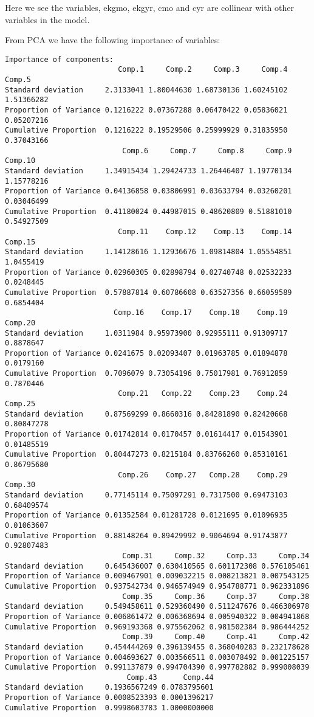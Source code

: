 \documentclass[a4paper]{article}
\begin{document}
Here we see the variables, ekgmo, ekgyr, cmo and cyr are collinear with other variables in the model. 

From PCA we have the following importance of variables:

\begin{lstlisting}[frame=single]
Importance of components:
                          Comp.1     Comp.2     Comp.3     Comp.4     Comp.5
Standard deviation     2.3133041 1.80044630 1.68730136 1.60245102 1.51366282
Proportion of Variance 0.1216222 0.07367288 0.06470422 0.05836021 0.05207216
Cumulative Proportion  0.1216222 0.19529506 0.25999929 0.31835950 0.37043166
                           Comp.6     Comp.7     Comp.8     Comp.9    Comp.10
Standard deviation     1.34915434 1.29424733 1.26446407 1.19770134 1.15778216
Proportion of Variance 0.04136858 0.03806991 0.03633794 0.03260201 0.03046499
Cumulative Proportion  0.41180024 0.44987015 0.48620809 0.51881010 0.54927509
                          Comp.11    Comp.12    Comp.13    Comp.14   Comp.15
Standard deviation     1.14128616 1.12936676 1.09814804 1.05554851 1.0455419
Proportion of Variance 0.02960305 0.02898794 0.02740748 0.02532233 0.0248445
Cumulative Proportion  0.57887814 0.60786608 0.63527356 0.66059589 0.6854404
                         Comp.16    Comp.17    Comp.18    Comp.19   Comp.20
Standard deviation     1.0311984 0.95973900 0.92955111 0.91309717 0.8878647
Proportion of Variance 0.0241675 0.02093407 0.01963785 0.01894878 0.0179160
Cumulative Proportion  0.7096079 0.73054196 0.75017981 0.76912859 0.7870446
                          Comp.21   Comp.22    Comp.23    Comp.24    Comp.25
Standard deviation     0.87569299 0.8660316 0.84281890 0.82420668 0.80847278
Proportion of Variance 0.01742814 0.0170457 0.01614417 0.01543901 0.01485519
Cumulative Proportion  0.80447273 0.8215184 0.83766260 0.85310161 0.86795680
                          Comp.26    Comp.27   Comp.28    Comp.29    Comp.30
Standard deviation     0.77145114 0.75097291 0.7317500 0.69473103 0.68409574
Proportion of Variance 0.01352584 0.01281728 0.0121695 0.01096935 0.01063607
Cumulative Proportion  0.88148264 0.89429992 0.9064694 0.91743877 0.92807483
                           Comp.31     Comp.32     Comp.33     Comp.34
Standard deviation     0.645436007 0.630410565 0.601172308 0.576105461
Proportion of Variance 0.009467901 0.009032215 0.008213821 0.007543125
Cumulative Proportion  0.937542734 0.946574949 0.954788771 0.962331896
                           Comp.35     Comp.36     Comp.37     Comp.38
Standard deviation     0.549458611 0.529360490 0.511247676 0.466306978
Proportion of Variance 0.006861472 0.006368694 0.005940322 0.004941868
Cumulative Proportion  0.969193368 0.975562062 0.981502384 0.986444252
                           Comp.39     Comp.40     Comp.41     Comp.42
Standard deviation     0.454444269 0.396139455 0.368040283 0.232178628
Proportion of Variance 0.004693627 0.003566511 0.003078492 0.001225157
Cumulative Proportion  0.991137879 0.994704390 0.997782882 0.999008039
                            Comp.43      Comp.44
Standard deviation     0.1936567249 0.0783795601
Proportion of Variance 0.0008523393 0.0001396217
Cumulative Proportion  0.9998603783 1.0000000000
\end{lstlisting}
\end{document}
